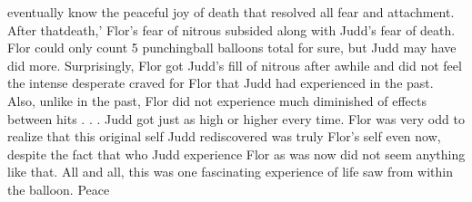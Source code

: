 \documentclass[12pt]{book}
\begin{document}
eventually know the peaceful joy of death that resolved all fear and attachment. After thatdeath,' Flor's fear of nitrous subsided along with Judd's fear of death. Flor could only count 5 punchingball balloons total for sure, but Judd may have did more. Surprisingly, Flor got Judd's fill of nitrous after awhile and did not feel the intense desperate craved for Flor that Judd had experienced in the past. Also, unlike in the past, Flor did not experience much diminished of effects between hits . . .  Judd got just as high or higher every time. Flor was very odd to realize that this original self Judd rediscovered was truly Flor's self even now, despite the fact that who Judd experience Flor as was now did not seem anything like that. All and all, this was one fascinating experience of life saw from within the balloon. Peace
\end{document}
